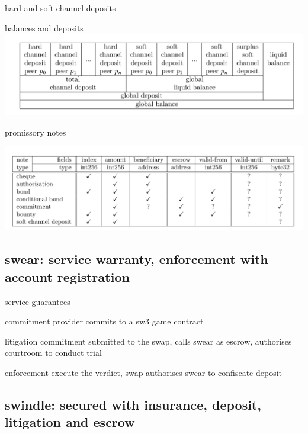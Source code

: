 \documentclass{beamer}
\begin{document}
\begin{frame}{hard and soft channel deposits}
\begin{block}{balances and deposits}
\includegraphics[width=\textwidth]{deposits.png}
\end{block}
\end{frame}


\begin{frame}{promissory notes}
\begin{block}{}
\includegraphics[width=\textwidth]{promissory-notes.png}
\end{block}
\end{frame}

\subsection[swear]{swear: service warranty, enforcement with account registration}
\begin{frame}{service guarantees}
  \begin{block}{commitment}
    provider commits to a sw3 game contract
  \end{block}
  \begin{block}{litigation}
    commitment submitted to the swap, calls swear as escrow, authorises courtroom to conduct trial
  \end{block}
  \begin{block}{enforcement}
    execute the verdict, swap authorises swear to confiscate deposit
  \end{block}
\end{frame}

\subsection[swindle]{swindle: secured with insurance, deposit, litigation and escrow}
\end{document}
